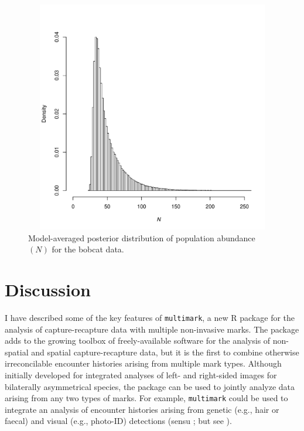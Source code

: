 \documentclass[12pt]{article}
\begin{document}
\begin{figure}
  \includegraphics[width=6in,height=4in]{modaveN.pdf}
  \begin{doublespace}
    \caption{\label{fig:modaveN}Model-averaged posterior distribution of population abundance $(N)$ for the bobcat data.}
  \end{doublespace}
\end{figure}

\section{Discussion}

I have described some of the key features of \verb|multimark|, a new R package for the analysis of capture-recapture data with multiple non-invasive marks. The package adds to the growing toolbox of freely-available software for the analysis of non-spatial \citep[e.g.,][]{WhiteBurnham1999,ChoquetEtAl2009,Laake2013,LaakeEtAl2013} and spatial \citep[e.g.,][]{GopalaswamyEtAl2012,Efford2015} capture-recapture data, but it is the first to combine otherwise irreconcilable encounter histories arising from multiple mark types. Although initially developed for integrated analyses of left- and right-sided images for bilaterally asymmetrical species, the package can be used to jointly analyze data arising from any two types of marks. For example, \verb|multimark| could be used to integrate an analysis of encounter histories arising from genetic (e.g., hair or faecal) and visual (e.g., photo-ID) detections (sensu \citealt{MadonEtAl2011}; but see \citealt{Bonner2013}).
\end{document}
